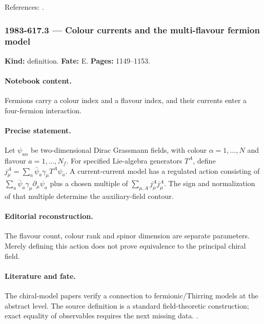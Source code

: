 \noindent References: \citep{wiegmann1984sun,polyakovwiegmann1983goldstone}.\par

\subsubsection{1983-617.3 --- Colour currents and the multi-flavour fermion model}

\label{item:1983-617.3}

\noindent\textbf{Kind:} definition. \textbf{Fate:} E. \textbf{Pages:} 1149--1153.\par

\paragraph{Notebook content.} Fermions carry a colour index and a flavour index, and their currents enter a four-fermion interaction.

\paragraph{Precise statement.} Let $\psi_{a\alpha}$ be two-dimensional Dirac Grassmann fields, with colour $\alpha=1,\ldots,N$ and flavour $a=1,\ldots,N_f$. For specified Lie-algebra generators $T^A$, define $j_\mu^A=\sum_a\bar\psi_a\gamma_\mu T^A\psi_a$. A current-current model has a regulated action consisting of $\sum_a\bar\psi_a\gamma_\mu\partial_\mu\psi_a$ plus a chosen multiple of $\sum_{\mu,A}j_\mu^Aj_\mu^A$. The sign and normalization of that multiple determine the auxiliary-field contour.

\paragraph{Editorial reconstruction.} The flavour count, colour rank and spinor dimension are separate parameters. Merely defining this action does not prove equivalence to the principal chiral field.

\paragraph{Literature and fate.} The chiral-model papers verify a connection to fermionic/Thirring models at the abstract level. The source definition is a standard field-theoretic construction; exact equality of observables requires the next missing data. \citep{polyakovwiegmann1983goldstone,polyakovwiegmann1984multivalued}.

